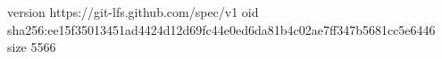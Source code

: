 version https://git-lfs.github.com/spec/v1
oid sha256:ee15f35013451ad4424d12d69fc44e0ed6da81b4c02ae7ff347b5681cc5e6446
size 5566
